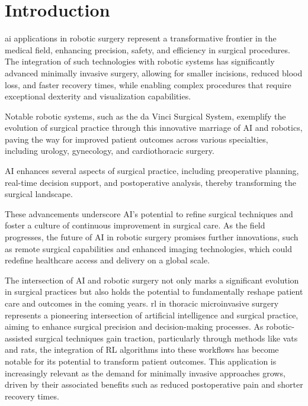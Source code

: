 
\chapter{Introduction}

\gls{ai} applications in robotic surgery represent a transformative frontier in the medical field, 
enhancing precision, safety, and efficiency in surgical procedures. 
The integration of such technologies with robotic systems has significantly advanced minimally 
invasive surgery, allowing for smaller incisions, reduced blood loss, and faster recovery times, 
while enabling complex procedures that require exceptional dexterity and visualization capabilities.

Notable robotic systems, such as the da Vinci Surgical System, exemplify the evolution of surgical 
practice through this innovative marriage of AI and robotics, paving the way for improved 
patient outcomes across various specialties, including urology, gynecology, and cardiothoracic surgery.

AI enhances several aspects of surgical practice, including preoperative planning, 
real-time decision support, and postoperative analysis, thereby transforming the surgical landscape.

These advancements underscore AI's potential to refine surgical techniques and foster a culture 
of continuous improvement in surgical care. As the field progresses, the future of AI in robotic 
surgery promises further innovations, such as remote surgical capabilities and enhanced imaging 
technologies, which could redefine healthcare access and delivery on a global scale.



The intersection of AI and robotic surgery not only marks a significant evolution in surgical practices but also holds the potential to fundamentally reshape patient care and outcomes in the coming years.
\gls{rl} in thoracic microinvasive surgery represents a pioneering intersection of artificial intelligence 
and surgical practice, aiming to enhance surgical precision and decision-making processes. 
As robotic-assisted surgical techniques gain traction, particularly through methods like 
\gls{vats} and \gls{rats}, 
the integration of RL algorithms into these workflows has become notable for its potential to 
transform patient outcomes. This application is increasingly relevant as the demand for minimally 
invasive approaches grows, driven by their associated benefits such as reduced postoperative pain 
and shorter recovery times.

